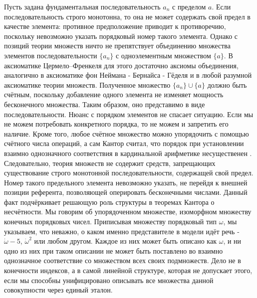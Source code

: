 \documentclass[12pt]{article}
\begin{document}
Пусть задана фундаментальная последовательность $a_n$ с пределом $a$. Если последовательность строго монотонна, то она не может содержать свой предел в качестве элемента: противное предположение приводит к противоречию, поскольку невозможно указать порядковый номер такого элемента. Однако с позиций теории множеств ничто не препятствует объединению множества элементов последовательности $\{a_n\}$ с одноэлементным множеством $\{a\}$. В аксиоматике Цермело–Френкеля \cite{fraenkel-axioms} для этого достаточно аксиомы объединения, аналогично в аксиоматике фон Неймана - Бернайса - Гёделя \cite{von-neumann-axioms} и в любой разумной аксиоматике теории множеств. Полученное множество $\{a_n\} \cup \{a\}$ должно быть счётным, поскольку добавление одного элемента не изменяет мощность бесконечного множества. Таким образом, оно представимо в виде последовательности. Нюанс с порядком элементов не спасает ситуацию. Если мы не можем потребовать конкретного порядка, то не можем и запретить его наличие. Кроме того, любое счётное множество можно упорядочить с помощью счётного числа операций, а сам Кантор считал, что порядок при установлении взаимно однозначного соответствия в кардинальной арифметике несущественен \cite{cantor-relation}. Следовательно, теория множеств не содержит средств, запрещающих существование строго монотонной последовательности, содержащей свой предел. Номер такого предельного элемента невозможно указать, не перейдя к внешней позиции референта, позволяющей оперировать бесконечными числами. Данный факт подчёркивает решающую роль структуры в теоремах Кантора о несчётности. Мы говорим об упорядоченном множестве, изоморфном множеству конечных порядковых чисел. Приписывая множеству порядковый тип $\omega$, мы указываем, что неважно, о каком именно представителе в модели идёт речь - $\dot{\omega}-5$, $\dot{\omega}^2$ или любом другом. Каждое из них может быть описано как $\omega$, и ни одно из них при таком описании не может быть поставлено во взаимно однозначное соответствие со множеством всех своих подмножеств. Дело не в конечности индексов, а в самой линейной структуре, которая не допускает этого, если мы способны унифицировано описывать все множества данной совокупности через единый эталон.
\end{document}

